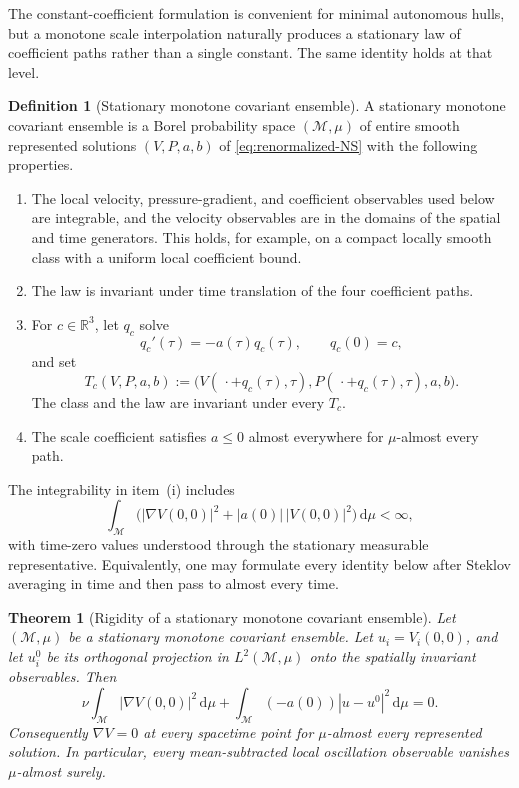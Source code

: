 \documentclass[11pt]{amsart}
\numberwithin{equation}{section}
\theoremstyle{plain}
\newtheorem{theorem}{Theorem}[section]
\theoremstyle{definition}
\newtheorem{definition}[definition]{Definition}
\theoremstyle{remark}
\newcommand{\R}{\mathbb R}
\newcommand{\dd}{\,\mathrm d}
\begin{document}
The constant-coefficient formulation is convenient for minimal autonomous
hulls, but a monotone scale interpolation naturally produces a stationary
law of coefficient paths rather than a single constant.  The same identity
holds at that level.

\begin{definition}[Stationary monotone covariant ensemble]
\label{def:stationary-monotone-ensemble}
A stationary monotone covariant ensemble is a Borel probability space
\((\mathcal M,\mu)\) of entire smooth represented solutions
\((V,P,a,b)\) of \eqref{eq:renormalized-NS} with the following properties.
\begin{enumerate}[label=\textup{(\roman*)},leftmargin=2.2em]
\item The local velocity, pressure-gradient, and coefficient observables used
below are integrable, and the velocity observables are in the domains of the
spatial and time generators.  This holds, for example, on a compact locally
smooth class with a uniform local coefficient bound.
\item The law is invariant under time translation of the four coefficient
paths.
\item For \(c\in\R^3\), let \(q_c\) solve
\begin{equation}\label{eq:variable-covariant-translation-path}
 q_c'(\tau)=-a(\tau)q_c(\tau),
 \qquad q_c(0)=c,
\end{equation}
and set
\[
 T_c(V,P,a,b)
 :=\bigl(V(\,\cdot+q_c(\tau),\tau),
         P(\,\cdot+q_c(\tau),\tau),a,b\bigr).
\]
The class and the law are invariant under every \(T_c\).
\item The scale coefficient satisfies \(a\le0\) almost everywhere for
\(\mu\)-almost every path.
\end{enumerate}
The integrability in item~\textup{(i)} includes
\[
 \int_{\mathcal M}
 \bigl(|\nabla V(0,0)|^2+|a(0)|\,|V(0,0)|^2\bigr)\dd\mu<\infty,
\]
with time-zero values understood through the stationary measurable
representative.  Equivalently, one may formulate every identity below after
Steklov averaging in time and then pass to almost every time.
\end{definition}

\begin{theorem}[Rigidity of a stationary monotone covariant ensemble]
\label{thm:stationary-monotone-ensemble-rigidity}
Let \((\mathcal M,\mu)\) be a stationary monotone covariant ensemble.  Let
\(u_i=V_i(0,0)\), and let \(u_i^0\) be its orthogonal projection in
\(L^2(\mathcal M,\mu)\) onto the spatially invariant observables.  Then
\begin{equation}\label{eq:variable-recurrent-energy-identity}
 \nu\int_{\mathcal M}|\nabla V(0,0)|^2\dd\mu
 +\int_{\mathcal M}(-a(0))|u-u^0|^2\dd\mu=0.
\end{equation}
Consequently \(\nabla V=0\) at every spacetime point for
\(\mu\)-almost every represented solution.  In particular, every
mean-subtracted local oscillation observable vanishes \(\mu\)-almost surely.
\end{theorem}
\end{document}
